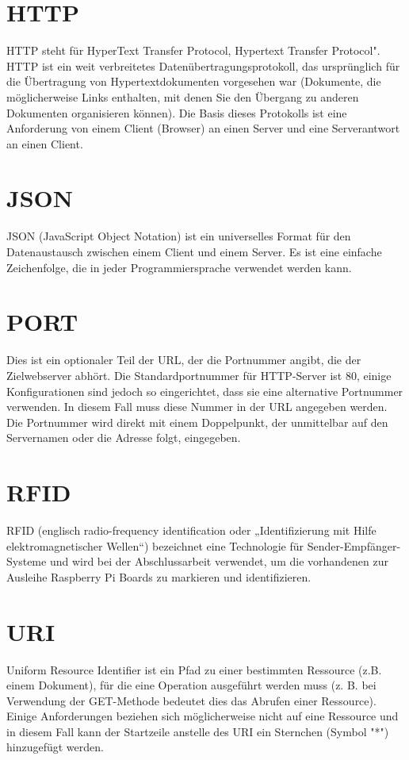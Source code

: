 \section*{HTTP}
\label{sec:appendix:http}
HTTP steht für HyperText Transfer Protocol, Hypertext Transfer Protocol". HTTP ist ein weit verbreitetes Datenübertragungsprotokoll, das ursprünglich für die Übertragung von Hypertextdokumenten vorgesehen war (Dokumente, die möglicherweise Links enthalten, mit denen Sie den Übergang zu anderen Dokumenten organisieren können). Die Basis dieses Protokolls ist eine Anforderung von einem Client (Browser) an einen Server und eine Serverantwort an einen Client.

\section*{JSON}
\label{sec:appendix:json}
JSON (JavaScript Object Notation) ist ein universelles Format für den Datenaustausch zwischen einem Client und einem Server. Es ist eine einfache Zeichenfolge, die in jeder Programmiersprache verwendet werden kann.

\section*{PORT} 
\label{sec:appendix:port}
Dies ist ein optionaler Teil der URL, der die Portnummer angibt, die der Zielwebserver abhört. Die Standardportnummer für HTTP-Server ist 80, einige Konfigurationen sind jedoch so eingerichtet, dass sie eine alternative Portnummer verwenden. In diesem Fall muss diese Nummer in der URL angegeben werden. Die Portnummer wird direkt mit einem Doppelpunkt, der unmittelbar auf den Servernamen oder die Adresse folgt, eingegeben.\cite[p.31]{shklar:webapplication} 

\section*{RFID}
\label{sec:appendix:rfid}
RFID (englisch radio-frequency identification oder „Identifizierung mit Hilfe elektromagnetischer Wellen“) bezeichnet eine Technologie für Sender-Empfänger-Systeme und wird bei der Abschlussarbeit verwendet, um die vorhandenen zur Ausleihe Raspberry Pi Boards zu markieren und identifizieren.

\section*{URI}
\label{sec:appendix:uri}
Uniform Resource Identifier ist ein Pfad zu einer bestimmten Ressource (z.B.  einem Dokument), für die eine Operation ausgeführt werden muss (z. B. bei Verwendung der GET-Methode bedeutet dies das Abrufen einer Ressource). Einige Anforderungen beziehen sich möglicherweise nicht auf eine Ressource und in diesem Fall kann der Startzeile anstelle des URI ein Sternchen (Symbol "*") hinzugefügt werden.


 